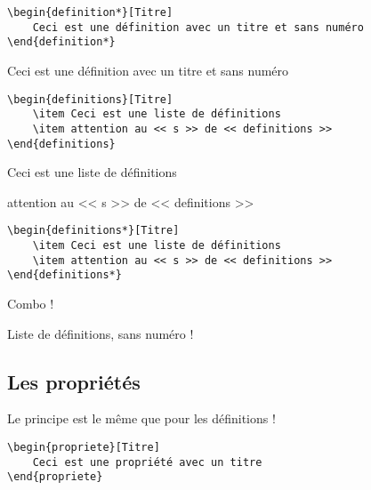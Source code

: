 \documentclass[a4paper,10pt]{article}
\begin{document}
		\begin{verbatim}
\begin{definition*}[Titre]
	Ceci est une définition avec un titre et sans numéro
\end{definition*}
		\end{verbatim}
		
\begin{definition*}[Titre]
	Ceci est une définition avec un titre et sans numéro
\end{definition*}


		\begin{verbatim}
\begin{definitions}[Titre]
	\item Ceci est une liste de définitions
	\item attention au << s >> de << definitions >>
\end{definitions}
		\end{verbatim}
		
\begin{definitions}[Titre]
	\item Ceci est une liste de définitions
	\item attention au << s >> de << definitions >>
\end{definitions}


		\begin{verbatim}
\begin{definitions*}[Titre]
	\item Ceci est une liste de définitions
	\item attention au << s >> de << definitions >>
\end{definitions*}
		\end{verbatim}
		
\begin{definitions*}[Titre]
	\item Combo !
	\item Liste de définitions, sans numéro !
\end{definitions*}







		\subsection{Les propriétés}

		Le principe est le même que pour les définitions !
		
		\begin{verbatim}
\begin{propriete}[Titre]
	Ceci est une propriété avec un titre
\end{propriete}
		\end{verbatim}
		
\end{document}

